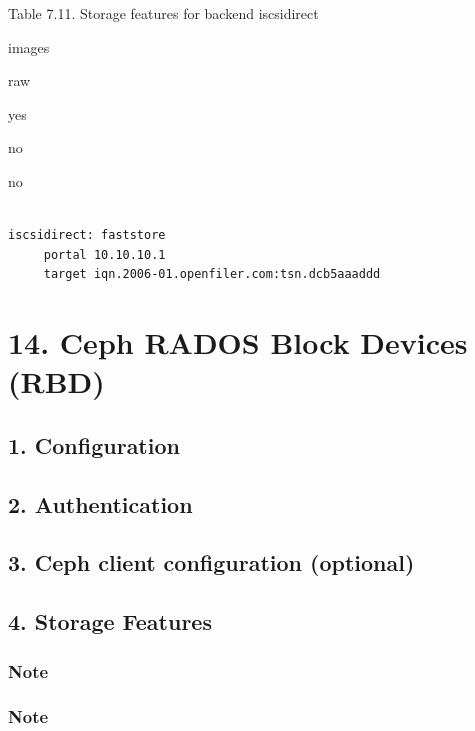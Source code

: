Table 7.11. Storage features for backend iscsidirect

images

raw

yes

no

no

\begin{lstlisting}

iscsidirect: faststore
     portal 10.10.10.1
     target iqn.2006-01.openfiler.com:tsn.dcb5aaaddd

\end{lstlisting}

\begin{table}[htbp]

\centering

\begin{tabular}

\end{tabular}

\end{table}


\section{14. Ceph RADOS Block Devices (RBD)}

\subsection{1. Configuration}

\subsection{2. Authentication}

\subsection{3. Ceph client configuration (optional)}

\subsection{4. Storage Features}

\subsubsection{Note}

\subsubsection{Note}

